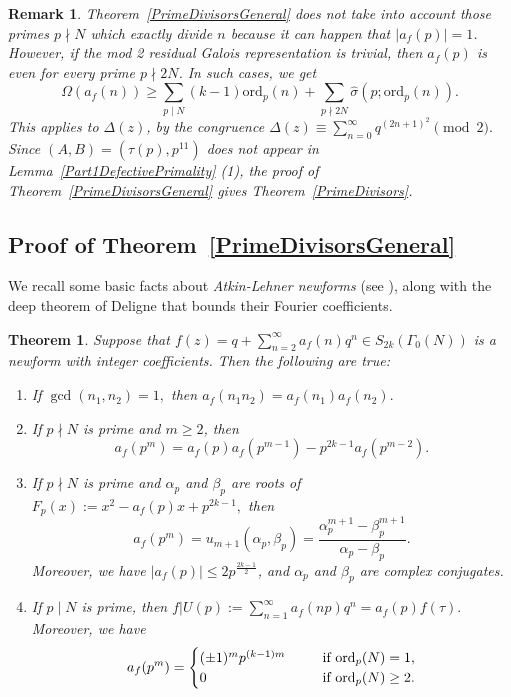 \documentclass[12pt]{amsart}
\newtheorem*{remark}{Remark}
\newtheorem{thm}{Theorem}[section]
\newcommand{\ord}{\mathrm{ord}}
\newcommand{\?}{\color{red}?}
\numberwithin{equation}{section}
\begin{document}
\begin{remark} 
Theorem~\ref{PrimeDivisorsGeneral} does not take into account those primes $p\nmid N$ which
exactly divide $n$ because it can happen that $|a_f(p)|=1$. 
However,  if the mod 2 residual Galois representation
is trivial, then $a_f(p)$ is even for every prime $p\nmid 2N$. In such cases, we get
$$
\Omega(a_f(n))\geq \sum_{p\mid N} (k-1)\ord_p(n) +\sum_{p\nmid 2N} \widehat{\sigma}(p;\ord_p(n)).
$$
This  applies to $\Delta(z)$, by the congruence
$\Delta(z)\equiv \sum_{n=0}^{\infty}q^{(2n+1)^2}\pmod 2.$
Since $(A,B)=(\tau(p),p^{11})$ does not appear in Lemma~\ref{Part1DefectivePrimality} (1), the proof of Theorem~\ref{PrimeDivisorsGeneral} gives
Theorem~\ref{PrimeDivisors}.
\end{remark}



\subsection{Proof of Theorem~\ref{PrimeDivisorsGeneral}}

We recall some basic facts about {\it Atkin-Lehner newforms} 
(see \cite{AtkinLehner, Miyake}), along with the deep theorem of Deligne  \cite{Deligne1, Deligne2} that bounds their Fourier coefficients. 

\begin{thm}\label{Newforms} Suppose that $f(z)=q+\sum_{n=2}^{\infty}a_f(n)q^n\in S_{2k}(\Gamma_0(N))$ is a newform with integer coefficients.
Then the following are true:
\begin{enumerate}
\item If $\gcd(n_1,n_2)=1,$ then $a_f(n_1 n_2)=a_f(n_1)a_f(n_2).$
\item If $p\nmid N$ is prime and $m\geq 2$, then
$$
a_f(p^m)=a_f(p)a_f(p^{m-1}) -p^{2k-1}a_f(p^{m-2}).
$$
\item If $p\nmid N$ is prime and $\alpha_p$ and $\beta_p$ are roots of $F_p(x):=x^2-a_f(p)x+p^{2k-1},$ then
$$
   a_f(p^m)=u_{m+1}(\alpha_p,\beta_p)=\frac{\alpha_p^{m+1}-\beta_p^{m+1}}{\alpha_p-\beta_p}.
$$   
Moreover, we have $|a_f(p)|\leq 2p^{\frac{2k-1}{2}}$, and $\alpha_p$ and $\beta_p$ are complex conjugates.

\item If $p\mid N$ is prime, then 
$f | U(p) := \sum_{n=1}^{\infty} a_f(np)q^n = a_f(p) f(\tau).$
Moreover, we have 
$$
a_f(p^m)=\begin{cases} (\pm 1)^m p^{(k-1)m} \ \ \ \ \  &{\text {\rm if}}\ \ord_p(N)=1,\\
0 \ \ \ \ \ &{\text {\rm if}}\ \ord_p(N)\geq 2.
\end{cases}
$$
\end{enumerate}
\end{thm}
\end{document}
